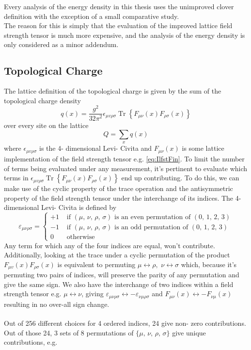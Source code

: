 \documentclass[a4paper,10pt]{book}
\begin{document}
Every analysis of the energy density in this thesis uses the unimproved clover definition with the exception of a small comparative study.\\The reason for this is simply that the evaluation of the improved lattice field strength tensor is much more expensive, and the analysis of the energy density is only considered as a minor addendum.  

\subsection{Topological Charge}
The lattice definition of the topological charge is given by the sum of the topological charge density 
\begin{equation}
q(x)=\frac{g^{2}}{32 \pi^{2}} \epsilon_{\mu v \rho \sigma} \operatorname{Tr}\left\{F_{\mu \nu}(x) F_{\rho \sigma}(x)\right\}
\end{equation}
over every site on the lattice
\begin{equation}
Q=\sum_{x} q(x)
\end{equation}
where $\epsilon_{\mu v \rho \sigma}$ is the 4- dimensional Levi- Civita and $F_{\mu \nu}(x)$ is some lattice implementation of the field strength tensor e.g. \eqref{eq:IlfstFin}. To limit the number of terms being evaluated under any measurement, it's pertinent to evaluate which terms in $\epsilon_{\mu v \rho \sigma} \operatorname{Tr}\left\{F_{\mu \nu}(x) F_{\rho \sigma}(x)\right\} $ end up contributing. To do this, we can make use of the cyclic property of the trace operation and the antisymmetric property of the field strength tensor under the interchange of its indices. The 4- dimensional Levi- Civita is defined by 
\begin{equation}
\varepsilon_{\mu\nu\rho\sigma}=\left\{\begin{aligned}
+1 & \text { if }(\mu,\,\nu,\,\rho,\,\sigma) \text { is an even permutation of }(0,\,1,\,2,\,3) \\
-1 & \text { if }(\mu,\,\nu,\,\rho,\,\sigma) \text { is an odd permutation of }(0,\,1,\,2,\,3) \\
0 & \text { otherwise }
\end{aligned}\right.
\end{equation}
Any term for which any of the four indices are equal, won't contribute. Additionally, looking at the trace under a cyclic permutation of the product $F_{\mu v}(x) F_{\rho \sigma}(x)$ is equivalent to permuting $\mu \leftrightarrow \rho,\,\,\nu \leftrightarrow \sigma $ which, because it's permuting two pairs of indices, will preserve the parity of any permutation and give the same sign. We also have the interchange of two indices within a field strength tensor e.g. $ \mu \leftrightarrow \nu$, giving $\varepsilon_{\mu\nu\rho\sigma} \leftrightarrow -\varepsilon_{\nu\mu\rho\sigma}$ and $F_{\mu \nu}(x) \leftrightarrow -F_{\nu \mu}(x)$ resulting in no over-all sign change.\\\\Out of 256 different choices for 4 ordered indices, 24 give non- zero contributions. Out of those 24, 3 sets of 8 permutations of $\{ \mu,\,\nu,\,\rho,\,\sigma\}$ give unique contributions, e.g.  
\end{document}
